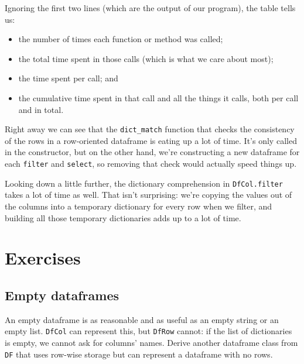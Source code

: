 \documentclass{scrbook}
\begin{document}
Ignoring the first two lines (which are the output of our program),
the table tells us:

\begin{itemize}

\item 

the number of times each function or method was called;



\item 

the total time spent in those calls (which is what we care about most);



\item 

the time spent per call; and



\item 

the cumulative time spent in that call and all the things it calls,
    both per call and in total.



\end{itemize}


Right away we can see that the \texttt{dict\_match} function
that checks the consistency of the rows in a row-oriented dataframe
is eating up a lot of time.
It's only called in the constructor,
but on the other hand,
we're constructing a new dataframe for each \texttt{filter} and \texttt{select},
so removing that check would actually speed things up.


Looking down a little further,
the dictionary comprehension in \texttt{DfCol.filter} takes a lot of time as well.
That isn't surprising:
we're copying the values out of the columns into a temporary dictionary
for every row when we filter,
and building all those temporary dictionaries adds up to a lot of time.


\section{Exercises}\label{dataframe-exercises}

\subsection*{Empty dataframes}


An empty dataframe is as reasonable and as useful as an empty string or an empty list.
\texttt{DfCol} can represent this,
but \texttt{DfRow} cannot:
if the list of dictionaries is empty,
we cannot ask for columns' names.
Derive another dataframe class from \texttt{DF} that uses row-wise storage
but can represent a dataframe with no rows.
\end{document}
